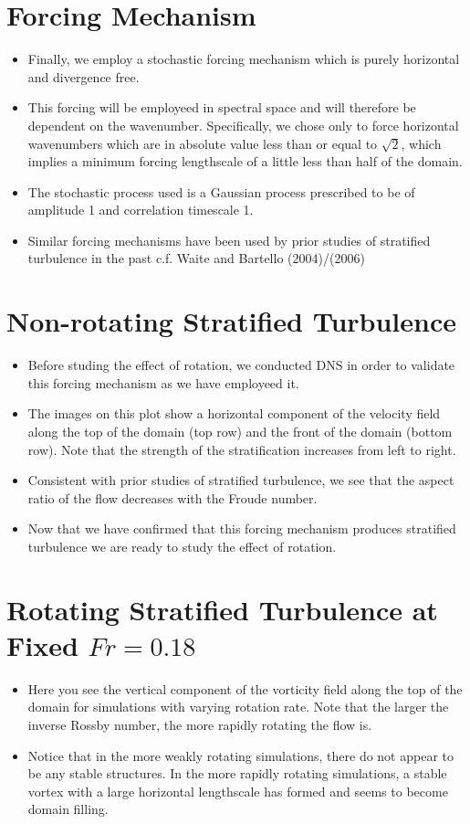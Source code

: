 \documentclass{article}
\begin{document}
\section{Forcing Mechanism}
\begin{itemize}
    \item Finally, we employ a stochastic forcing mechanism which is purely
    horizontal and divergence free. 
    \item This forcing will be employeed in spectral space and will therefore be
    dependent on the wavenumber. Specifically, we chose only to force horizontal
    wavenumbers which are in absolute value less than or equal to $\sqrt{2}$,
    which implies a minimum forcing lengthscale of a little less than half of
    the domain.
    \item The stochastic process used is a Gaussian process prescribed to be of
    amplitude 1 and correlation timescale 1. 
    \item Similar forcing mechanisms have been used by prior
    studies of stratified turbulence in the past c.f. Waite and Bartello
    (2004)/(2006)
\end{itemize}

\section{Non-rotating Stratified Turbulence}
\begin{itemize}
    \item Before studing the effect of rotation, we conducted DNS in order to
    validate this forcing mechanism as we have employeed it. 
    \item The images on this plot show a horizontal component of the velocity field
    along the top of the domain (top row) and the front of the domain (bottom
    row). Note that the strength of the stratification increases from left to right. 
    \item Consistent with prior studies of stratified turbulence, we see that
    the aspect ratio of the flow decreases with the Froude number. 
    \item Now that we have confirmed that this forcing mechanism produces
    stratified turbulence we are ready to study the effect of rotation. 
\end{itemize}

\section{Rotating Stratified Turbulence at Fixed $Fr = 0.18$}
\begin{itemize}
    \item Here you see the vertical component of the vorticity field
    along the top of the domain for simulations with varying rotation rate. Note
    that the larger the inverse Rossby number, the more rapidly rotating the
    flow is. 
    \item Notice that in the more weakly rotating simulations, there do not
    appear to be any stable structures. In the more
    rapidly rotating simulations, a stable vortex with a large horizontal
    lengthscale has formed and seems to become domain filling. 
\end{itemize}
\end{document}
